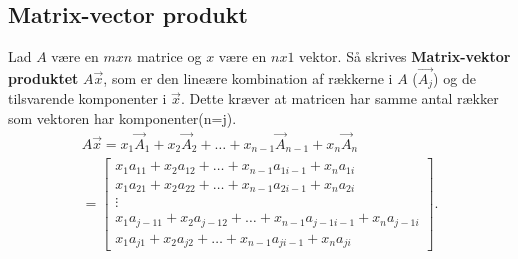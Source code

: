 \subsection{Matrix-vector produkt}

\begin{defn}
Lad $A$ være en $mxn$ matrice og $x$ være en $nx1$ vektor. Så skrives \textbf{Matrix-vektor produktet} $A\vec{x}$, som er den lineære kombination af rækkerne i $A$ ($\vec{A_j}$) og de tilsvarende komponenter i $\vec{x}$. Dette kræver at matricen har samme antal rækker som vektoren har komponenter(n=j).
\begin{align*}
A\vec{x}=x_1\vec{A}_1+x_2\vec{A}_2+ \dots +x_{n-1}\vec{A}_{n-1}+x_n\vec{A}_n \\
=
\begin{bmatrix}
x_1a_{1 1}+x_2a_{1 2}+\dots +x_{n-1}a_{1 i-1}+x_na_{1 i} \\
x_1a_{2 1}+x_2a_{2 2}+\dots +x_{n-1}a_{2 i-1}+x_na_{2 i}\\
\vdots\\
x_1a_{j-1 1}+x_2a_{j-1 2}+\dots +x_{n-1}a_{j-1 i-1}+x_na_{j-1 i} \\
x_1a_{j 1}+x_2a_{j 2}+\dots +x_{n-1}a_{j i-1}+x_na_{j i}
\end{bmatrix}.
\end{align*}
\end{defn}

